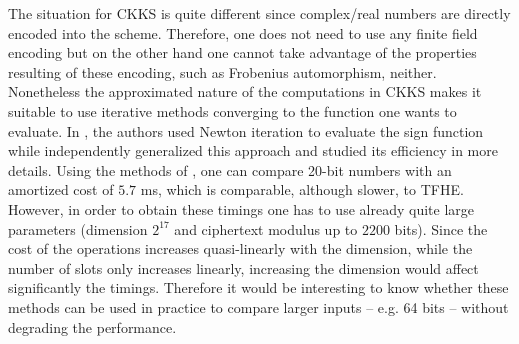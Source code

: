 The situation for CKKS is quite different since complex/real numbers are directly encoded into the scheme. Therefore, one does not need to use any finite field encoding but on the other hand one cannot take advantage of the properties resulting of these encoding, such as Frobenius automorphism, neither. Nonetheless the approximated nature of the computations in CKKS makes it suitable to use iterative methods converging to the function one wants to evaluate. In \cite{BMSZ20}, the authors used Newton iteration to evaluate the sign function while independently \cite{AC:CKKLL19,EPRINT:CheKimKim19} generalized this approach and studied its efficiency in more details. Using the methods of \cite{EPRINT:CheKimKim19}, one can compare 20-bit numbers with an amortized cost of $5.7$ ms, which is comparable, although slower, to TFHE. However, in order to obtain these timings one has to use already quite large parameters (dimension $2^{17}$ and ciphertext modulus up to $2200$ bits). Since the cost of the operations increases quasi-linearly with the dimension, while the number of slots only increases linearly, increasing the dimension would affect significantly the timings. Therefore it would be interesting to know whether these methods can be used in practice to compare larger inputs -- e.g. 64 bits -- without degrading the performance. 




  

